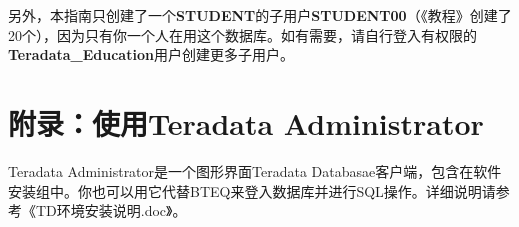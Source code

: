 \documentclass{article}
\begin{document}
			另外，本指南只创建了一个\textbf{STUDENT}的子用户\textbf{STUDENT00}（《教程》创建了20个），因为只有你一个人在用这个数据库。如有需要，请自行登入有权限的\textbf{Teradata\_Education}用户创建更多子用户。

		\section*{附录：使用Teradata Administrator}
			Teradata Administrator是一个图形界面Teradata Databasae客户端，包含在软件安装组中。你也可以用它代替BTEQ来登入数据库并进行SQL操作。详细说明请参考《TD环境安装说明.doc》。

			


		
\end{document}
